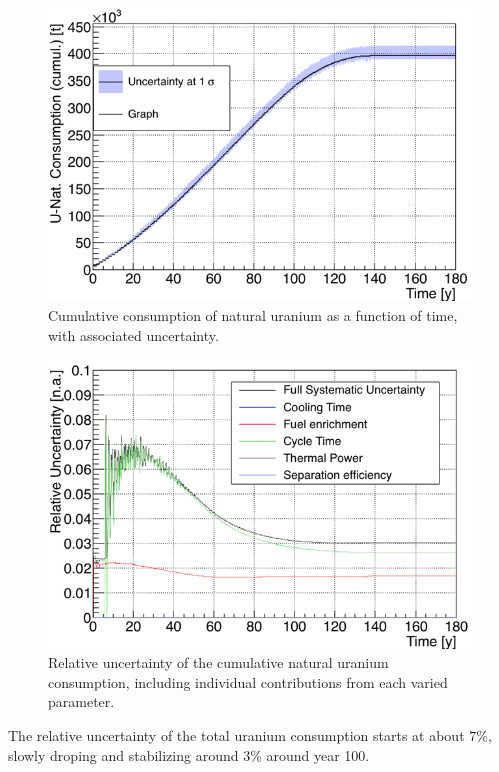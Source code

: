 \documentclass{anstrans}
\begin{document}
\begin{figure}[t] %
    \centering
    \includegraphics[scale=0.3]{unat_full}
    \caption{Cumulative consumption of natural uranium as a function of time, with
      associated uncertainty.}\label{fig:unat_full}
\end{figure}


\begin{figure}[t] %
    \centering
    \includegraphics[scale=0.3]{unat_uncer}
    \caption{Relative uncertainty of the cumulative natural uranium consumption, including
      individual contributions from each varied parameter.}\label{fig:unatr_uncer}
\end{figure}

The relative uncertainty of the total uranium consumption starts at about
$7\%$, slowly droping and stabilizing around $3\%$ around year 100.
\end{document}

